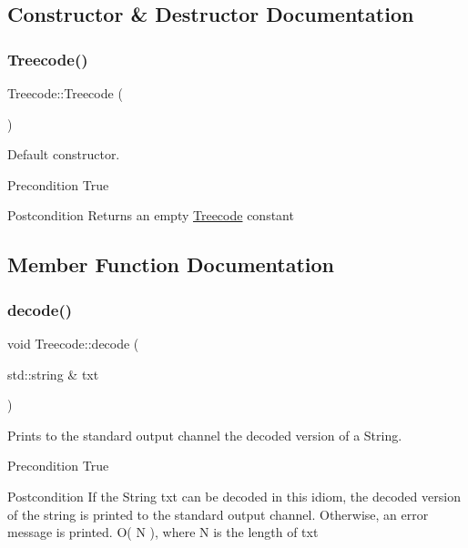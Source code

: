 \subsection{Constructor \& Destructor Documentation}
\mbox{\label{classTreecode_a190d6af790b7046ed7c96e7a57f0cd38}} 
\subsubsection{\texorpdfstring{Treecode()}{Treecode()}}
{\footnotesize\ttfamily Treecode\+::\+Treecode (\begin{DoxyParamCaption}{ }\end{DoxyParamCaption})}



Default constructor. 

\begin{DoxyPrecond}{Precondition}
True 
\end{DoxyPrecond}
\begin{DoxyPostcond}{Postcondition}
Returns an empty \hyperlink{classTreecode}{Treecode}  constant 
\end{DoxyPostcond}


\subsection{Member Function Documentation}
\mbox{\label{classTreecode_ad1da0bce9134c31f346bf24997f17156}} 
\subsubsection{\texorpdfstring{decode()}{decode()}}
{\footnotesize\ttfamily void Treecode\+::decode (\begin{DoxyParamCaption}\item[{std\+::string \&}]{txt }\end{DoxyParamCaption})}



Prints to the standard output channel the decoded version of a String. 

\begin{DoxyPrecond}{Precondition}
True 
\end{DoxyPrecond}
\begin{DoxyPostcond}{Postcondition}
If the String txt can be decoded in this idiom, the decoded version of the string is printed to the standard output channel. Otherwise, an error message is printed.  O( N ), where N is the length of txt 
\end{DoxyPostcond}
\mbox{\label{classTreecode_accab83a4e32dcb0c17ec67ab40f020cc}} 
